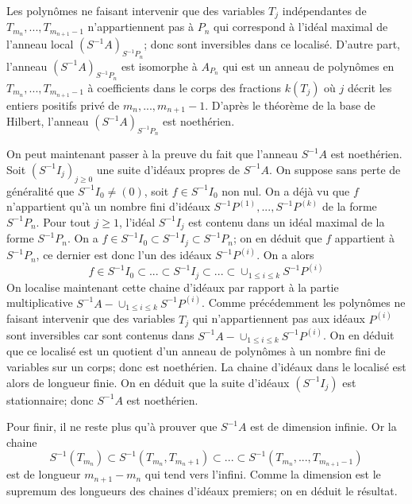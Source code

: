 \documentclass{article}
\begin{document}
Les polynômes ne faisant intervenir que des variables $T_j$ indépendantes de $T_{m_n}, ..., T_{m_{n+1}-1}$ n'appartiennent pas à $P_n$ qui correspond à l'idéal maximal de l'anneau local $(S^{-1}A)_{S^{-1}P_n}$; donc sont inversibles dans ce localisé. D'autre part, l'anneau $(S^{-1}A)_{S^{-1}P_n}$ est isomorphe à $A_{P_n}$ qui est un anneau de polynômes en $T_{m_n}, ..., T_{m_{n+1}-1}$ à coefficients dans le corps des fractions $k(T_j)$ où $j$ décrit les entiers positifs privé de $m_n, ..., m_{n+1}-1$. D'après le théorème de la base de Hilbert, l'anneau $(S^{-1}A)_{S^{-1}P_n}$ est noethérien.

On peut maintenant passer à la preuve du fait que l'anneau $S^{-1}A$ est noethérien. Soit $(S^{-1}I_j)_{j \geq 0}$ une suite d'idéaux propres de $S^{-1}A$. On suppose sans perte de généralité que $S^{-1}I_0 \neq (0)$, soit $f \in S^{-1}I_0$ non nul. On a déjà vu que $f$ n'appartient qu'à un nombre fini d'idéaux $S^{-1}P^{(1)}, ..., S^{-1}P^{(k)}$ de la forme $S^{-1}P_n$. Pour tout $j \geq 1$, l'idéal $S^{-1}I_j$ est contenu dans un idéal maximal de la forme $S^{-1}P_n$. On a $f \in S^{-1}I_0 \subset S^{-1}I_j \subset S^{-1}P_n$; on en déduit que $f$ appartient à $S^{-1}P_n$, ce dernier est donc l'un des idéaux $S^{-1}P^{(i)}$.
On a alors
\begin{equation*}
f \in S^{-1}I_0 \subset ... \subset S^{-1}I_j \subset ... \subset \cup_{1 \leq i \leq k}S^{-1}P^{(i)}
\end{equation*}
On localise maintenant cette chaine d'idéaux par rapport à la partie multiplicative $S^{-1}A-\cup_{1 \leq i \leq k}S^{-1}P^{(i)}$. Comme précédemment les polynômes ne faisant intervenir que des variables $T_j$ qui n'appartiennent pas aux idéaux $P^{(i)}$ sont inversibles car sont contenus dans $S^{-1}A-\cup_{1 \leq i \leq k}S^{-1}P^{(i)}$. On en déduit que ce localisé est un quotient d'un anneau de polynômes à un nombre fini de variables sur un corps; donc est noethérien. La chaine d'idéaux dans le localisé est alors de longueur finie. On en déduit que la suite d'idéaux $(S^{-1}I_j)$ est stationnaire; donc $S^{-1}A$ est noethérien.

Pour finir, il ne reste plus qu'à prouver que $S^{-1}A$ est de dimension infinie. Or la chaine
\begin{equation*}
S^{-1}(T_{m_n}) \subset S^{-1}(T_{m_n}, T_{m_n+1}) \subset ... \subset S^{-1}(T_{m_n}, ..., T_{m_{n+1}-1})
\end{equation*}
est de longueur $m_{n+1} - m_n$ qui tend vers l'infini. Comme la dimension est le supremum des longueurs des chaines d'idéaux premiers; on en déduit le résultat.
\end{document}
